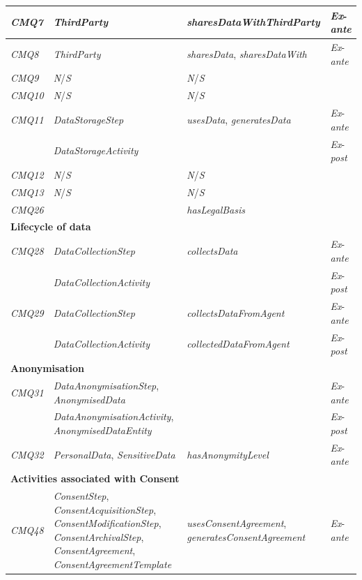 \begin{table}[htbp]
\begin{tabularx}{\linewidth}{|l|X|p{5cm}|l|}
\textit{CMQ7} & \textit{ThirdParty} & \textit{sharesDataWithThirdParty} & \textit{Ex}-\textit{ante} \\ \hline
\textit{CMQ8} & \textit{ThirdParty} & \textit{sharesData}, \textit{sharesDataWith} & \textit{Ex}-\textit{ante} \\ \hline
\textit{CMQ9} & \textit{N}/\textit{S} & \textit{N}/\textit{S} &  \\ \hline
\textit{CMQ10} & \textit{N}/\textit{S} & \textit{N}/\textit{S} &  \\ \hline
\textit{CMQ11} & \textit{DataStorageStep} & \textit{usesData}, \textit{generatesData} & \textit{Ex}-\textit{ante} \\ \hline
 & \textit{DataStorageActivity} &  & \textit{Ex}-\textit{post} \\ \hline
\textit{CMQ12} & \textit{N}/\textit{S} & \textit{N}/\textit{S} &  \\ \hline
\textit{CMQ13} & \textit{N}/\textit{S} & \textit{N}/\textit{S} &  \\ \hline
\textit{CMQ26} &  & \textit{hasLegalBasis} &  \\ \hline
\multicolumn{4}{|l|}{\textbf{Lifecycle of data}} \\ \hline
\textit{CMQ28} & \textit{DataCollectionStep} & \textit{collectsData} & \textit{Ex}-\textit{ante} \\ \hline
 & \textit{DataCollectionActivity} &  & \textit{Ex}-\textit{post} \\ \hline
\textit{CMQ29} & \textit{DataCollectionStep} & \textit{collectsDataFromAgent} & \textit{Ex}-\textit{ante} \\ \hline
 & \textit{DataCollectionActivity} & \textit{collectedDataFromAgent} & \textit{Ex}-\textit{post} \\ \hline
\multicolumn{4}{|l|}{\textbf{Anonymisation}} \\ \hline
\textit{CMQ31} & \textit{DataAnonymisationStep}, \textit{AnonymisedData} &  & \textit{Ex}-\textit{ante} \\ \hline
 & \textit{DataAnonymisationActivity}, \textit{AnonymisedDataEntity} &  & \textit{Ex}-\textit{post} \\ \hline
\textit{CMQ32} & \textit{PersonalData}, \textit{SensitiveData} & \textit{hasAnonymityLevel} & \textit{Ex}-\textit{ante} \\ \hline
\multicolumn{4}{|l|}{\textbf{Activities associated with Consent}} \\ \hline
\textit{CMQ48} & \textit{ConsentStep}, \textit{ConsentAcquisitionStep}, \textit{ConsentModificationStep}, \textit{ConsentArchivalStep}, \textit{ConsentAgreement}, \textit{ConsentAgreementTemplate} & \textit{usesConsentAgreement}, \textit{generatesConsentAgreement} & \textit{Ex}-\textit{ante} \\ \hline

\end{tabularx}
\end{table}
